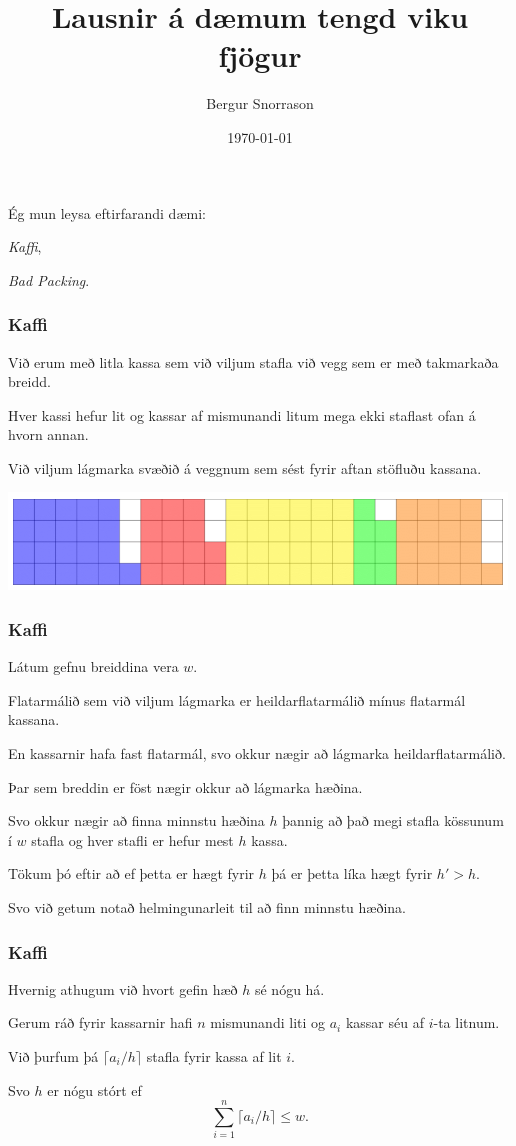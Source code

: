 \title{Lausnir á dæmum tengd viku fjögur}
\author{Bergur Snorrason}
\date{\today}



\frame{\titlepage}

{
	{
		\item<1-> Ég mun leysa eftirfarandi dæmi:
		{
			\item<2-> \emph{Kaffi},
			\item<3-> \emph{Bad Packing}.
		}
	}
}

{
	\frametitle{Kaffi}
	{
		\item<1-> Við erum með litla kassa sem við viljum stafla við vegg sem er með takmarkaða breidd.
		\item<2-> Hver kassi hefur lit og kassar af mismunandi litum mega ekki staflast ofan á hvorn annan.
		\item<3-> Við viljum lágmarka svæðið á veggnum sem sést fyrir aftan stöfluðu kassana.
		\item<4->[] \includegraphics[scale = 0.5]{fig/kaffi.png}
	}
}

{
	\frametitle{Kaffi}
	{
		\item<1-> Látum gefnu breiddina vera $w$.
		\item<2-> Flatarmálið sem við viljum lágmarka er heildarflatarmálið mínus flatarmál kassana.
		\item<3-> En kassarnir hafa fast flatarmál, svo okkur nægir að lágmarka heildarflatarmálið.
		\item<4-> Þar sem breddin er föst nægir okkur að lágmarka hæðina.
		\item<5-> Svo okkur nægir að finna minnstu hæðina $h$ þannig að það megi stafla kössunum í $w$ stafla og hver stafli er hefur mest $h$ kassa.
		\item<6-> Tökum þó eftir að ef þetta er hægt fyrir $h$ þá er þetta líka hægt fyrir $h' > h$.
		\item<7-> Svo við getum notað helmingunarleit til að finn minnstu hæðina.
	}
}

{
	\frametitle{Kaffi}
	{
		\item<1-> Hvernig athugum við hvort gefin hæð $h$ sé nógu há.
		\item<2-> Gerum ráð fyrir kassarnir hafi $n$ mismunandi liti og $a_i$ kassar séu af $i$-ta litnum.
		\item<3-> Við þurfum þá $\lceil a_i/h \rceil$ stafla fyrir kassa af lit $i$.
		\item<4-> Svo $h$ er nógu stórt ef
		\[
			\sum_{i = 1}^n \lceil a_i/h \rceil \leq w.
		\]
	}
}

